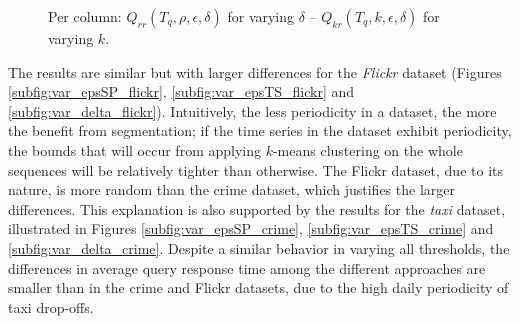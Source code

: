 \begin{figure}[ht!]
 \quad
{}
\caption{Per column: $Q_{rr}(T_q, \rho, \epsilon, \delta)$ for varying $\delta$ -- $Q_{kr}(T_q, k, \epsilon, \delta)$ for varying $k$.}
\label{fig:exp1_sim}
\end{figure}

The results are similar but with larger differences for the {\em Flickr} dataset (Figures \ref{subfig:var_epsSP_flickr}, \ref{subfig:var_epsTS_flickr} and \ref{subfig:var_delta_flickr}). Intuitively, the less periodicity in a dataset, the more the benefit from segmentation; if the time series in the dataset exhibit periodicity, the bounds that will occur from applying $k$-means clustering on the whole sequences will be relatively tighter than otherwise. The Flickr dataset, due to its nature, is more random than the crime dataset, which justifies the larger differences. This explanation is also supported by the results for the {\em taxi} dataset, illustrated in Figures \ref{subfig:var_epsSP_crime}, \ref{subfig:var_epsTS_crime} and \ref{subfig:var_delta_crime}. Despite a similar behavior in varying all thresholds, the differences in average query response time among the different approaches are smaller than in the crime and Flickr datasets, due to the high daily periodicity of taxi drop-offs.

